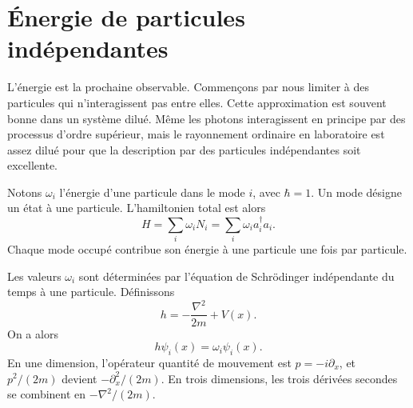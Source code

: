 \begin{classroomqa}
\end{classroomqa}

\section{Énergie de particules indépendantes}

L’énergie est la prochaine observable. Commençons par nous limiter à des particules qui n’interagissent pas entre elles. Cette approximation est souvent bonne dans un système dilué. Même les photons interagissent en principe par des processus d’ordre supérieur, mais le rayonnement ordinaire en laboratoire est assez dilué pour que la description par des particules indépendantes soit excellente.

Notons \(\omega_i\) l’énergie d’une particule dans le mode \(i\), avec \(\hbar=1\). Un mode désigne un état à une particule. L’hamiltonien total est alors
\begin{equation}
H=\sum_i\omega_i N_i
=\sum_i\omega_i a_i^\dagger a_i.
\label{eq:l07-mode-hamiltonian}
\end{equation}
Chaque mode occupé contribue son énergie à une particule une fois par particule.

\begin{classroomqa}
\end{classroomqa}

Les valeurs \(\omega_i\) sont déterminées par l’équation de Schrödinger indépendante du temps à une particule. Définissons
\begin{equation}
h=-\frac{\nabla^2}{2m}+V(x).
\label{eq:l07-one-particle-h}
\end{equation}
On a alors
\begin{equation}
h\psi_i(x)=\omega_i\psi_i(x).
\label{eq:l07-schrodinger-eigenvalue}
\end{equation}
En une dimension, l’opérateur quantité de mouvement est \(p=-i\partial_x\), et \(p^2/(2m)\) devient \(-\partial_x^2/(2m)\). En trois dimensions, les trois dérivées secondes se combinent en \(-\nabla^2/(2m)\).

